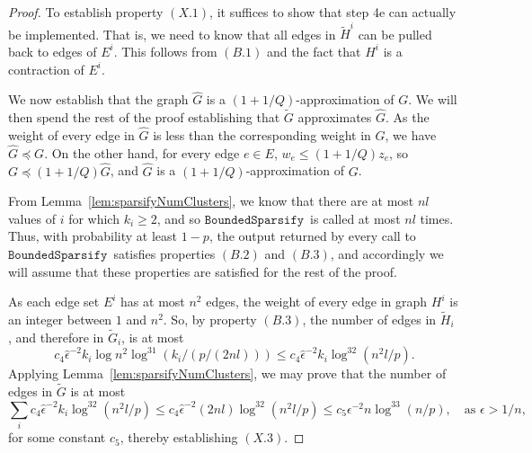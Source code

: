 \documentclass[11pt]{article}
\newcommand{\boundedsparsify}{\ensuremath{\mathtt{BoundedSparsify}}}
\def\Htil{\widetilde{H}}
\def\Gtil{\widetilde{G}}
\def\Ghat{\widehat{G}}
\def\epshat{\hat{\epsilon}}
\def\pleq{\preccurlyeq}
\def\pleq{\preccurlyeq}
\begin{document}
\begin{proof}
To establish property $(X.1)$, it suffices to show that step 4e can
  actually be implemented.
That is, we need to know that all edges in $\Htil^{i}$ can be pulled
  back to edges of $E^{i}$.
This follows from $(B.1)$ and the fact that $H^{i}$ is a contraction
  of $E^{i}$.

We now establish that the graph $\Ghat$ is a $(1+1/Q)$-approximation
  of $G$.
We will then spend the rest of the proof establishing that $\Gtil$
  approximates $\Ghat$.
As the weight of every edge in $\Ghat$ is less than the corresponding
  weight in $G$, we have $\Ghat \pleq G$.
On the other hand, for every edge $e \in E$, $w_{e} \leq (1+1/Q) z_{e}$,
  so $G \pleq (1+1/Q) \Ghat$, and
  $\Ghat$ is a $(1+1/Q)$-approximation of $G$.

From Lemma~\ref{lem:sparsifyNumClusters}, we know that there are at most
  $nl$ values of $i$ for which $k_{i} \geq 2$,
  and so \boundedsparsify \ is called at most $nl$ times.
Thus, with probability at least $1-p$, the output returned by every call
  to \boundedsparsify \ satisfies properties $(B.2)$ and $(B.3)$, and accordingly
  we will assume that these properties are satisfied for the rest of the proof.

As each edge set $E^{i}$ has at most $n^{2}$ edges, the weight
  of every edge in graph $H^{i}$ is an integer between $1$ and $n^{2}$.
So, by property $(B.3)$, the number of edges in $\Htil_{i}$ , and therefore
  in $\Gtil_{i}$, is at most
\[
c_{4} \epshat^{-2}  k_{i} \log n^{2} \log^{31} (k_{i}/ (p / (2nl))) 
\leq
c_{4} \epshat^{-2}  k_{i} \log^{32} ( n^{2}l/ p).
\]
Applying Lemma~\ref{lem:sparsifyNumClusters}, we may prove that the number of edges
  in $\Gtil$ is at most
\[
\sum_{i}
c_{4} \epshat^{-2} k_{i}  \log^{32} ( n^{2}l/ p) 
\leq
c_{4} \epshat^{-2} (2 nl)  \log^{32} ( n^{2}l/ p)
\leq
c_{5} \epsilon^{-2} n  \log^{33} (n/ p), \quad \text{as $\epsilon > 1/n$,}
\]
for some constant $c_{5}$,
  thereby establishing $(X.3)$.


\end{proof}
\end{document}
